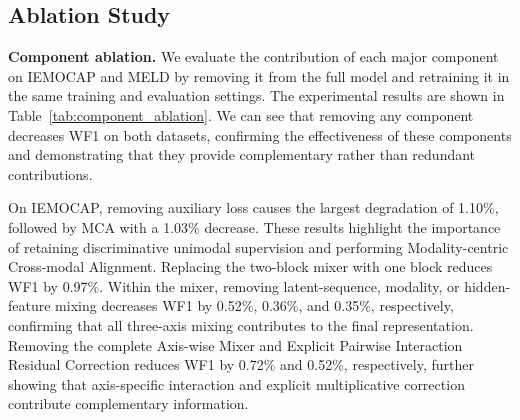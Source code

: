 \documentclass[letterpaper]{article} %
\begin{document}
\begin{table}[t]
\centering
{}
\caption{Modality ablation results on IEMOCAP and MELD. All values
are percentages.}
\label{tab:modality_ablation}
\end{table}

\subsection{Ablation Study}

\noindent\textbf{Component ablation.}
We evaluate the contribution of each major component on IEMOCAP and MELD by removing it from the full model and retraining it in the same training and evaluation settings. The experimental results are shown in Table~\ref{tab:component_ablation}. We can see that removing any component decreases WF1 on both datasets, confirming the effectiveness of these components and demonstrating that they provide complementary rather than redundant contributions. 

On IEMOCAP, removing auxiliary loss causes the largest degradation of 1.10\%, followed by MCA with a 1.03\% decrease. These results highlight the importance of retaining discriminative unimodal supervision and performing Modality-centric Cross-modal Alignment. Replacing the two-block mixer with one block reduces WF1 by 0.97\%. Within the mixer, removing latent-sequence, modality, or hidden-feature mixing decreases WF1 by 0.52\%, 0.36\%, and 0.35\%, respectively, confirming that all three-axis mixing contributes to the final representation. Removing the complete Axis-wise Mixer and Explicit Pairwise Interaction Residual Correction reduces WF1 by 0.72\% and 0.52\%, respectively, further showing that axis-specific interaction and explicit
multiplicative correction contribute complementary information.
\end{document}
